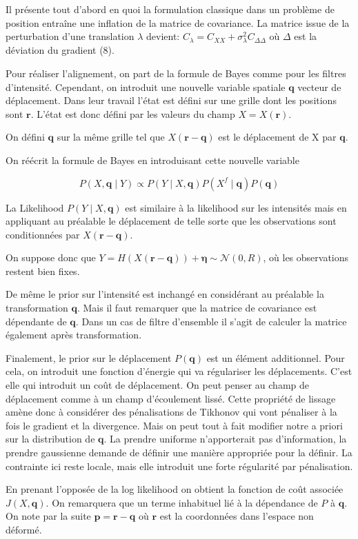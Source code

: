 \documentclass{article}
\newcommand{\bq}{\bm{q}}
\newcommand{\bp}{\bm{p}}
\newcommand{\br}{\bm{r}}
\begin{document}
Il présente tout d'abord en quoi la formulation classique dans un problème de position entraîne une inflation de la matrice de covariance. La matrice issue de la perturbation d'une translation $\lambda$ devient: $C_{\lambda} = C_{XX} + \sigma^2_{\lambda} C_{\Delta\Delta}$ où $\Delta$ est la déviation du gradient (8).

Pour réaliser l'alignement, on part de la formule de Bayes comme pour les filtres d'intensité. Cependant, on introduit une nouvelle variable spatiale $\bq$ vecteur de déplacement. Dans leur travail l'état est défini sur une grille dont les positions sont $\br$. L'état est donc défini par les valeurs du champ $X = X(\br)$.

On défini $\bq$ sur la même grille tel que $X(\br  - \bq)$ est le déplacement de X par $\bq$.

On réécrit la formule de Bayes en introduisant cette nouvelle variable

$$
    P(X, \bq \mid Y) \propto P(Y \mid X, \bq) P(X^f \mid \bq) P(\bq)
$$

La Likelihood $P(Y \mid X, \bq)$ est similaire à la likelihood sur les intensités mais en appliquant au préalable le déplacement de telle sorte que les observations sont conditionnées par $X(\br - \bq)$.

On suppose donc que $Y = H(X(\br - \bq)) + \bm{\eta} \sim \mathcal{N}(0, R)$, où les observations restent bien fixes.

De même le prior sur l'intensité est inchangé en considérant au préalable la transformation $\bq$. Mais il faut remarquer que la matrice de covariance est dépendante de $\bq$. Dans un cas de filtre d'ensemble il s'agit de calculer la matrice également après transformation.

Finalement, le prior sur le déplacement $P(\mathbf{q})$ est un élément additionnel. Pour cela, on introduit une fonction d'énergie qui va régulariser les déplacements. C'est elle qui introduit un coût de déplacement. On peut penser au champ de déplacement comme à un champ d'écoulement lissé. Cette propriété de lissage amène donc à considérer des pénalisations de Tikhonov qui vont pénaliser à la fois le gradient et la divergence. Mais on peut tout à fait modifier notre a priori sur la distribution de $\mathbf{q}$. La prendre uniforme n'apporterait pas d'information, la prendre gaussienne demande de définir une manière appropriée pour la définir. La contrainte ici reste locale, mais elle introduit une forte régularité par pénalisation.

En prenant l'opposée de la log likelihood on obtient la fonction de coût associée $J(X, \bq)$. On remarquera que un terme inhabituel lié à la dépendance de $P$ à $\bq$. On note par la suite $\bp = \br - \bq$ où $\br$ est la coordonnées dans l'espace non déformé.
\end{document}
